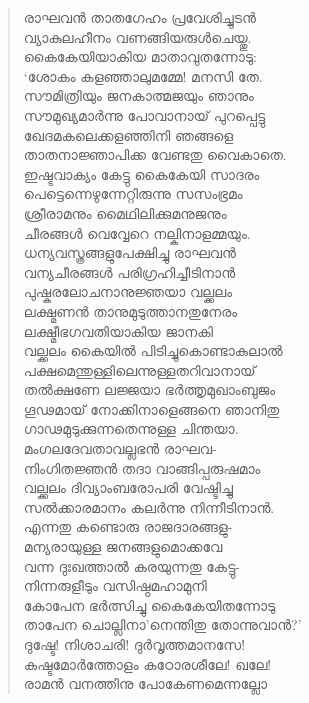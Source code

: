 \begin{verse}
രാഘവന്‍ താതഗേഹം പ്രവേശിച്ചുടന്‍\\
വ്യാകുലഹീനം വണങ്ങിയരുള്‍ചെയ്തു.\\
കൈകേയിയാകിയ മാതാവുതന്നോടു:\\
‘ശോകം കളഞ്ഞാലുമമ്മേ! മനസി തേ.\\
സൗമിത്രിയും ജനകാത്മജയും ഞാനും\\
സൗമുഖ്യമാര്‍ന്നു പോവാനായ് പുറപ്പെട്ടു\\
ഖേദമകലെക്കളഞ്ഞിനി ഞങ്ങളെ\\
താതനാജ്ഞാപിക്ക വേണ്ടതു വൈകാതെ.\\
ഇഷ്ടവാക്യം കേട്ടു കൈകേയി സാദരം\\
പെട്ടെന്നെഴുന്നേറ്റിരുന്നു സസംഭ്രമം\\
ശ്രീരാമനും മൈഥിലിക്കുമനുജനും\\
ചീരങ്ങള്‍ വെവ്വേറെ നല്കിനാളമ്മയും.\\
ധന്യവസ്ത്രങ്ങളുപേക്ഷിച്ചു രാഘവന്‍\\
വന്യചീരങ്ങള്‍ പരിഗ്രഹിച്ചീടിനാന്‍\\
പുഷ്കരലോചനാനുജ്ഞയാ വല്ക്കലം\\
ലക്ഷ്മണന്‍ താനുമുടുത്താനതുനേരം\\
ലക്ഷ്മീഭഗവതിയാകിയ ജാനകി\\
വല്ക്കലം കൈയില്‍ പിടിച്ചുകൊണ്ടാകുലാല്‍\\
പക്ഷമെന്തുള്ളിലെന്നുള്ളതറിവാനായ്\\
തല്‍ക്ഷണേ ലജ്ജയാ ഭര്‍ത്തൃമുഖാംബുജം\\
ഗൂഢമായ് നോക്കിനാളെങ്ങനെ ഞാനിതു\\
ഗാഢമുടുക്കുന്നതെന്നുള്ള ചിന്തയാ.\\
മംഗലദേവതാവല്ലഭന്‍ രാഘവ-\\
നിംഗിതജ്ഞന്‍ തദാ വാങ്ങിപ്പരുഷമാം\\
വല്ക്കലം ദിവ്യാംബരോപരി വേഷ്ടിച്ചു\\
സല്‍ക്കാരമാനം കലര്‍ന്നു നിന്നീടിനാന്‍.\\
എന്നതു കണ്ടൊരു രാജദാരങ്ങളു-\\
മന്യരായുള്ള ജനങ്ങളുമൊക്കവേ\\
വന്ന ദുഃഖത്താല്‍ കരയുന്നതു കേട്ടു-\\
നിന്നരുളീടും വസിഷ്ഠമഹാമുനി\\
കോപേന ഭര്‍ത്സിച്ചു കൈകേയിതന്നോടു\\
താപേന ചൊല്ലിനാ’നെന്തിതു തോന്നുവാന്‍?’\\
ദുഷ്ടേ! നിശാചരി! ദുര്‍വൃത്തമാനസേ!\\
കഷ്ടമോര്‍ത്തോളം കഠോരശീലേ! ഖലേ!\\
രാമന്‍ വനത്തിനു പോകേണമെന്നല്ലോ\\

\end{verse}
